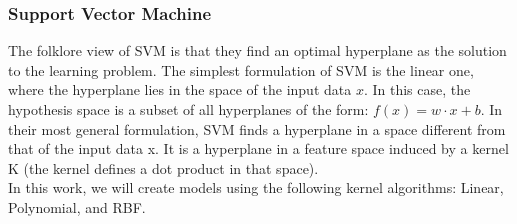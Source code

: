 \subsubsection{Support Vector Machine}
\label{subsub:svm}
The folklore view of SVM is that they find an optimal hyperplane as the solution to the learning problem. The simplest formulation of SVM is the linear one, where the hyperplane lies in the space of the input data \(x\). In this case, the hypothesis space is a subset of all hyperplanes of the form:
\(f(x) = w \cdotp x +b\).
In their most general formulation, SVM finds a hyperplane in a space different from that of the input data x. It is a hyperplane in a feature space induced by a kernel K (the kernel defines a dot product in that space)\cite{SVMEvgeniou}.\\
In this work, we will create models using the following kernel algorithms: Linear\cite{SVMTraining}, Polynomial\cite{SVMTraining}, and RBF\cite{SVMTraining}. 




